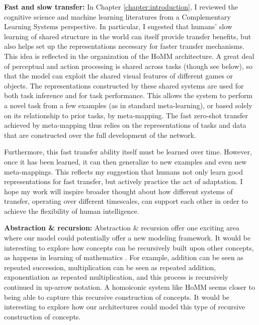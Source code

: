 \textbf{Fast and slow transfer:} In Chapter \ref{chapter:introduction}, I reviewed the cognitive science and machine learning literatures from a Complementary Learning Systems perspective. In particular, I sugested that humans' slow learning of shared structure in the world can itself provide transfer benefits, but also helps set up the representations necessary for faster transfer mechanisms. This idea is reflected in the organization of the HoMM architecture. A great deal of perceptual and action processing is shared across tasks (though see below), so that the model can exploit the shared visual features of different games or objects. The representations constructed by these shared systems are used for both task inference and for task performance. This allows the system to perform a novel task from a few examples (as in standard meta-learning), or based solely on its relationship to prior tasks, by meta-mapping. The fast zero-shot transfer achieved by meta-mapping thus relies on the representations of tasks and data that are constructed over the full development of the network. \par

Furthermore, this fast transfer ability itself must be learned over time. However, once it has been learned, it can then generalize to new examples and even new meta-mappings. This reflects my suggestion that humans not only learn good representations for fast transfer, but actively practice the act of adaptation. I hope my work will inspire broader thought about how different systems of transfer, operating over different timescales, can support each other in order to achieve the flexibility of human intelligence.\par

\textbf{Abstraction \& recursion:} Abstraction \& recursion offer one exciting area where our model could potentially offer a new modeling framework. It would be interesting to explore how concepts can be recursively built upon other concepts, as happens in learning of mathematics \citep{Wilensky1991, Hazzan1999, Lampinen2017b}. For example, addition can be seen as repeated succession, multiplication can be seen as repeated addition, exponentiation as repeated multiplication, and this process is recursively continued in up-arrow notation. A homoiconic system like HoMM seems closer to being able to capture this recursive construction of concepts. It would be interesting to explore how our architectures could model this type of recursive construction of concepts. \par 

